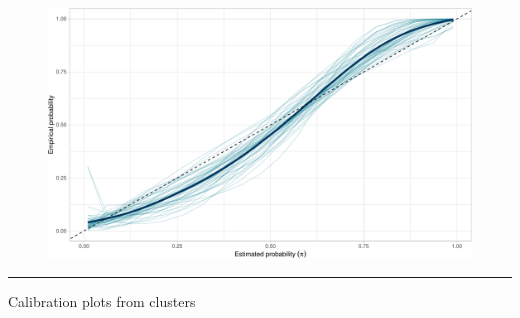 \documentclass[
  letterpaper,
  DIV=11,
  numbers=noendperiod]{scrartcl}
\begin{document}
\begin{figure}[H]

{\centering \includegraphics{index_files/figure-pdf/unnamed-chunk-3-1.pdf}

}

\end{figure}

\begin{center}\rule{0.5\linewidth}{0.5pt}\end{center}

{ Calibration plots from clusters}
\end{document}
